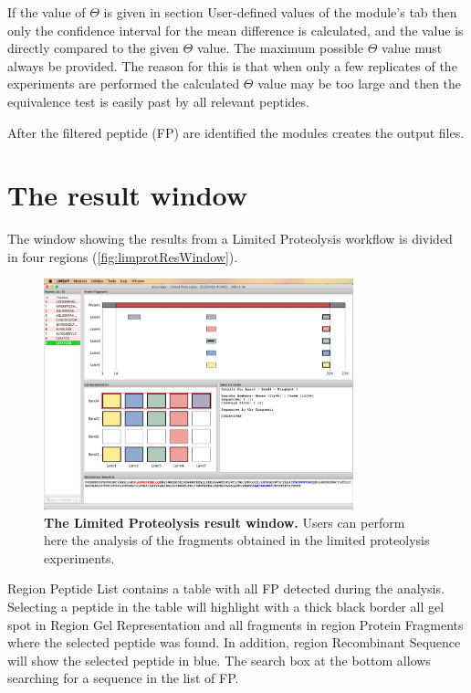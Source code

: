 If the value of $\Theta$ is given in section User-defined values of the module's tab
then only the confidence interval for the mean difference is calculated, and the value
is directly compared to the given $\Theta$ value. The maximum possible $\Theta$ value
must always be provided. The reason for this is that when only a few replicates of the
experiments are performed the calculated $\Theta$ value may be too large and then
the equivalence test is easily past by all relevant peptides.

After the filtered peptide (FP) are identified the modules creates the output files.

\section{The result window}

The window showing the results from a Limited Proteolysis workflow is divided in
four regions (\autoref{fig:limprotResWindow}).

\begin{figure}[h]
    \centering
    \includegraphics[width=0.8\textwidth]{./IMAGES/MOD-LIMPROT/limprot-res.jpg}
    \caption[The Limited Proteolysis result window]{\textbf{The Limited Proteolysis
    result window.} Users can perform here the analysis of the fragments obtained
    in the limited proteolysis experiments.}
    \label{fig:limprotResWindow}
    \vspace{-5pt}
\end{figure}

Region Peptide List contains a table with all FP detected during the analysis. Selecting
a peptide in the table will highlight with a thick black border all gel spot in
Region Gel Representation and all fragments in region Protein Fragments where the
selected peptide was found. In addition, region Recombinant Sequence will show the
selected peptide in blue. The search box at the bottom allows searching for a sequence
in the list of FP.


